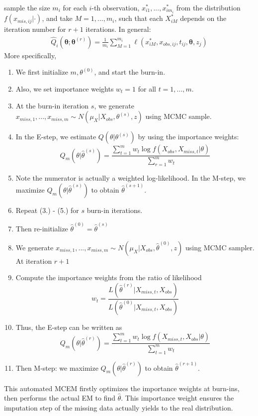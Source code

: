 \documentclass[preprint,12pt]{elsarticle}
\begin{document}
sample the size $m_i$ for each $i$-th observation, $x_{i1}^*,...,x_{im_i}^*$ from the distribution $f(x_{mis,ij}|\cdot)$, and take $M = 1,...,m_i$, such that each $X_{iM}^*$ depends on the iteration number for $r+1$ iterations. In general:
\begin{align}
    \hat{Q}_i(\boldsymbol{\theta}; \boldsymbol{\theta}^{(r)})=\frac{1}{m_i}\sum_{M=1}^{m_i}\ell(x_{iM}^*, x_{obs,ij},t_{ij}, \boldsymbol{\theta},z_j)
\end{align}
More specifically, 
\begin{enumerate}
    \item We first initialize $m, \theta^{(0)}$, and start the burn-in.
    \item Also, we set importance weights $w_t=1$ for all $t=1,...,m$.
    \item At the burn-in iteration $s$, we generate $x_{miss,1}, ..., x_{miss,m}\sim N(\mu_{X}|X_{obs}, \theta^{(s)}, z)$ using MCMC sample.
    \item In the E-step, we estimate $Q(\theta|\theta^{(s)})$ by using the importance weights:
    \begin{equation}
        Q_m(\theta|\hat{\theta}^{(s)})=\frac{\sum_{t=1}^m w_t\log f(X_{obs}, X_{miss,t}|\theta)}{\sum_{r=1}^mw_t}
    \end{equation}
    \item Note the numerator is actually a weighted log-likelihood. In the M-step, we maximize $Q_m(\theta|\hat{\theta}^{(s)})$ to obtain $\hat{\theta}^{(s+1)}$. 
    \item Repeat (3.) - (5.) for $s$ burn-in iterations.
    \item Then re-initialize $\hat{\theta}^{(0)}=\hat{\theta}^{(s)}$
    \item We generate $x_{miss,1},...,x_{miss,m}\sim N(\mu_{X}|X_{obs}, \hat{\theta}^{(0)}, z)$ using MCMC sampler. At iteration $r+1$
    \item Compute the importance weights from the ratio of likelihood
    \begin{equation}
        w_t=\frac{L(\hat{\theta}^{(r)}|X_{miss,t}, X_{obs})}{L(\hat{\theta}^{(0)}|X_{miss,t}, X_{obs})}
    \end{equation}
    \item Thus, the E-step can be written as 
    \begin{equation}
        Q_m(\theta|\hat{\theta}^{(r)})=\frac{\sum_{t=1}^mw_t\log f(X_{miss,t}, X_{obs}|\theta)}{\sum_{t=1}^m w_t}
    \end{equation}
    \item Then M-step: we maximize $Q_m(\theta|\hat{\theta}^{(r)})$ to obtain $\hat{\theta}^{(r+1)}$. 
\end{enumerate}
This automated MCEM firstly optimizes the importance weights at burn-ins, then performs the actual EM to find $\hat{\theta}$. This importance weight ensures the imputation step of the missing data actually yields to the real distribution. 
   
\end{document}
